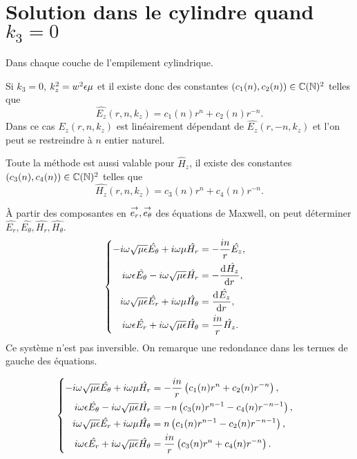 \section[Solution dans le cylindre quand k3 = 0]{Solution dans le cylindre quand \(k_3 = 0\)}
  \label{sec:annexe:cylindre:k3_nul}

  Dans chaque couche de l'empilement cylindrique.

  Si \(k_3 = 0\), \(k_z^2 = w^2\eps\mu\) et il existe donc des constantes \((c_1(n),c_2(n)) \in \CC(\NN)^2\) telles que
  \begin{equation*}
    \hat{E_z}(r,n,k_z) = c_1(n) r^n + c_2(n)r^{-n}.
  \end{equation*}
  Dans ce cas \(\hat{E_z}(r,n,k_z)\) est linéairement dépendant de  \(\hat{E_z}(r,-n,k_z)\) et l'on peut se restreindre à \(n\) entier naturel.

  Toute la méthode est aussi valable pour \(\hat H_z\), il existe des constantes \((c_3(n),c_4(n)) \in \CC(\NN)^2\) telles que
  \begin{equation*}
    \hat{H_z}(r,n,k_z) = c_3(n) r^n + c_4(n)r^{-n}.
  \end{equation*}

  À partir des composantes en \(\vect{e_r},\vect{e_\theta}\) des équations de Maxwell, on peut déterminer \(\hat{E_r},\hat{E_\theta},\hat{H_r},\hat{H_\theta}\).
  \begin{align*}
      &\left\lbrace
      \begin{aligned}
          -i\w\sqrt{\mu\eps}\hat{E_\theta} + i\w\mu \hat{H_r} &= -\frac{in}{r}\hat{E_z},
          \\
          i\w\eps \hat{E_\theta} - i\w\sqrt{\mu\eps} \hat{H_r} &= -\ddp{r}{\hat{H_z}},          
          \\
          i\w\sqrt{\mu\eps}\hat{E_r} + i\w\mu \hat{H_\theta} &= \ddp{r}{\hat{E_z}},
          \\
          i\w\eps \hat{E_r} + i\w\sqrt{\mu\eps} \hat{H_\theta} &= \frac{in}{r}\hat{H_z}.
      \end{aligned}
      \right.
  \end{align*}
  Ce système n'est pas inversible. On remarque une redondance dans les termes de gauche des équations.

  \begin{align*}
      &\left\lbrace
      \begin{aligned}
          -i\w\sqrt{\mu\eps}\hat{E_\theta} + i\w\mu \hat{H_r} &= -\frac{in}{r}\left(c_1(n) r^n + c_2(n)r^{-n}\right),
          \\
          i\w\eps \hat{E_\theta} - i\w\sqrt{\mu\eps} \hat{H_r} &= -n\left(c_3(n)r^{n-1} - c_4(n)r^{-n-1}\right),           
          \\
          i\w\sqrt{\mu\eps}\hat{E_r} + i\w\mu \hat{H_\theta} &= n\left(c_1(n)r^{n-1} - c_2(n)r^{-n-1}\right),
          \\
          i\w\eps \hat{E_r} + i\w\sqrt{\mu\eps} \hat{H_\theta} &= \frac{in}{r}\left(c_3(n) r^n + c_4(n)r^{-n}\right).
      \end{aligned}
      \right.
  \end{align*}

